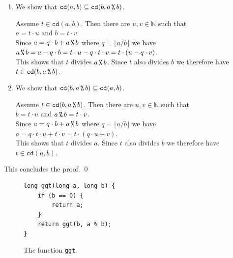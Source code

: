 \begin{enumerate}
\item We show that $\mathtt{cd}(a, b) \subseteq \mathtt{cd}(b, a \,\texttt{\%}\, b)$.

      Assume $t \in \mathtt{cd}(a, b)$.  Then there are $u, v \in \mathbb{N}$ such that
      \\[0.2cm]
      \hspace*{1.3cm}
      $a = t \cdot u$ \quad and \quad $b = t \cdot v$.
      \\[0.2cm]
      Since $a = q \cdot b + a \,\texttt{\%}\, b$ where $q = \lfloor a / b \rfloor$ we have
      \\[0.2cm]
      \hspace*{1.3cm}
      $a \,\texttt{\%}\, b = a - q \cdot b = t \cdot u - q \cdot t \cdot v = t \cdot (u - q \cdot v)$.
      \\[0.2cm]
      This shows that $t$ divides $a \,\texttt{\%}\, b$. Since $t$ also divides $b$ we therefore have
      $t \in \mathtt{cd}(b, a \,\texttt{\%}\, b)$. \green{$\surd$}
\item We show that $\mathtt{cd}(b, a \,\texttt{\%}\, b) \subseteq \mathtt{cd}(a, b)$.

      Assume $t \in \mathtt{cd}(b, a \,\texttt{\%}\, b)$.  Then there are $u, v \in \mathbb{N}$ such that
      \\[0.2cm]
      \hspace*{1.3cm}
      $b = t \cdot u$ \quad and \quad $a \,\texttt{\%}\, b = t \cdot v$.
      \\[0.2cm]
      Since $a = q \cdot b + a \,\texttt{\%}\, b$ where $q = \lfloor a / b \rfloor$ we have
      \\[0.2cm]
      \hspace*{1.3cm}
      $a = q \cdot t \cdot u + t \cdot v = t \cdot (q \cdot u + v)$.
      \\[0.2cm]
      This shows that $t$ divides $a$. Since $t$ also divides $b$ we therefore have
      $t \in \mathtt{cd}(a, b)$. \green{$\surd$}
\end{enumerate}
This concludes the proof. \qed

\begin{figure}[!h]
  \centering
\begin{verbatim}
long ggt(long a, long b) {
    if (b == 0) {
        return a;
    }
    return ggt(b, a % b);
}
\end{verbatim}
\vspace*{-0.3cm}
  \caption{The function \texttt{ggt}.}
  \label{fig:gcd}
\end{figure}

